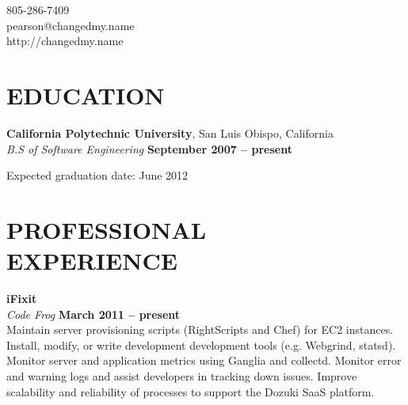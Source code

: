 \documentclass[margin,line]{resume}
\begin{document}
{
    \sc
    \hfill 805-286-7409                   \vspace{0mm}\\\vspace{0mm}%
    \hfill pearson@changedmy.name         \vspace{0mm}\\\vspace{0mm}%
    \hfill http://changedmy.name          \vspace{0mm}\\\vspace{-9mm}%
}

\begin{resume}

\vspace{6mm}

    \section{\mysidestyle \textbf{\large{E}\small{DUCATION}}}

    \textbf{\listing California Polytechnic University}, San Luis Obispo, California \vspace{2mm}\\\vspace{1mm}%
    \textsl{B.S of Software Engineering} \hfill \textbf{ September 2007 -- present}\vspace{-3mm}\\\vspace{-1mm}%
    \begin{list2}
        \item Expected graduation date: June 2012
    \end{list2}\vspace{-1.5mm}


\sectionline

    \section{\mysidestyle \textbf{\large{P}\small{ROFESSIONAL\\EXPERIENCE}}}

    \textbf{\listing iFixit} \vspace{2mm}\\\vspace{1mm}%
    \textsl{Code Frog} \hfill \textbf{March 2011 -- present}\\
    Maintain server provisioning scripts (RightScripts and Chef) for EC2 instances.
    Install, modify, or write development development tools (e.g. Webgrind, statsd).
    Monitor server and application metrics using Ganglia and collectd.
    Monitor error and warning logs and assist developers in tracking down issues.
    Improve scalability and reliability of processes to support the Dozuki SaaS platform.


\end{resume}
\end{document}
